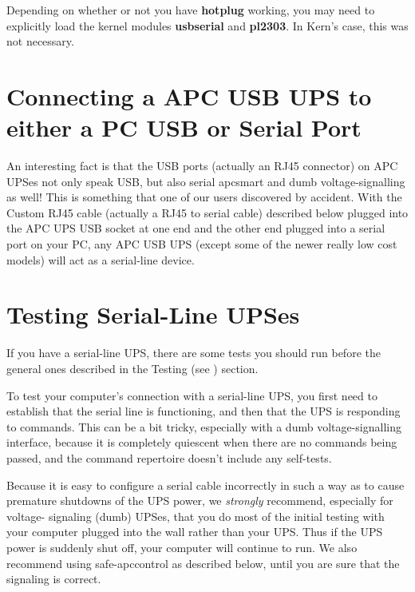 {{{{{{{{{{Depending on whether or not you have {\bf hotplug} working, you may need to
explicitly load the kernel modules {\bf usbserial} and {\bf pl2303}. In Kern's
case, this was not necessary. 

\label{Connecting-a-APC-USB-UPS-to-either-a-PC-USB-or-Serial-Port}

\section*{Connecting a APC USB UPS to either a PC USB or Serial Port}

An interesting fact is that the USB ports (actually an RJ45 connector) on APC
UPSes not only speak USB, but also serial apcsmart and dumb voltage-signalling
as well! This is something that one of our users discovered by accident. With
the Custom RJ45 cable (actually a RJ45 to serial cable) described below
plugged into the APC UPS USB socket at one end and the other end plugged into
a serial port on your PC, any APC USB UPS (except some of the newer really low
cost models) will act as a serial-line device. 



\label{Testing-Serial_002dLine-UPSes}
\section*{Testing Serial-Line UPSes}

\label{index-Testing_002c-Serial-219}
\label{index-Serial_002c-Testing-220}
If you have a serial-line UPS, there are some tests you should run before the
general ones described in the Testing (see 
) section.  

To test your computer's connection with a serial-line UPS, you first need to
establish that the serial line is functioning, and then that the UPS is
responding to commands.  This can be a bit tricky, especially with a dumb
voltage-signalling interface, because it is completely quiescent when there
are no commands being passed, and the command repertoire doesn't include any
self-tests.  

Because it is easy to configure a serial cable incorrectly in such a way as to
cause premature shutdowns of the UPS power, we {\it strongly} recommend,
especially for voltage- signaling (dumb) UPSes, that you do most of the
initial testing with your computer plugged into the wall rather than your UPS.
Thus if the UPS power is suddenly shut off, your computer will continue to
run. We also recommend using safe-apccontrol as described below, until you are
sure that the signaling is correct.  

}}}}}}}}}}
